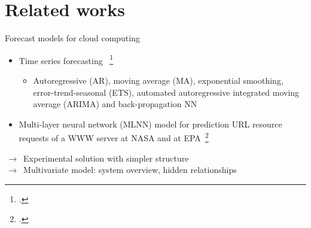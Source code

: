 \documentclass{beamer}
\begin{document}
\section{Related works}
\begin{frame}{ Forecast models for cloud computing}
	\begin{itemize}
			\item{
				Time series forecasting ~\footcite{Hipel et al. 1994}
				}
				\begin{itemize}
					\item {
						Autoregressive (AR), moving average (MA), exponential smoothing, error-trend-seasonal (ETS), automated autoregressive integrated moving average (ARIMA) and back-propagation NN  
					}
				\end{itemize}	

			\item {
	 			Multi-layer neural network (MLNN) model for prediction URL resource requests of a WWW server at NASA and at EPA~\footcite{Prevost et al. 2011}  
			}
	\end{itemize}
	\vspace{0.3cm}
		$\,\to\,$ Experimental solution with simpler structure\\
		$\,\to\,$ Multivariate model: system overview, hidden relationships
\end{frame}


%	
\end{document}
